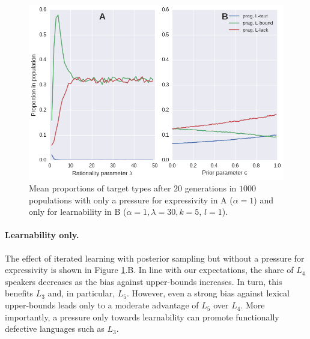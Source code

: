 \documentclass[a4paper]{article}
\begin{document}


\begin{figure}
\centering
\includegraphics[scale=.5]{./fig1-only-R-or-M}
\caption{Mean proportions of target types after $20$ generations in $1000$ populations with only a pressure for expressivity in A ($\alpha = 1$) and only for learnability in B ($\alpha =1, \lambda = 30, k = 5$, $l=1$).}
\label{fig:either-R-or-M}
\end{figure}

\paragraph{Learnability only.} The effect of iterated learning with posterior sampling but without a pressure for expressivity is shown in Figure \ref{fig:either-R-or-M}.B. In line with our expectations, the share of $L_4$ speakers decreases as the bias against upper-bounds increases. In turn, this benefits $L_3$ and, in particular, $L_5$. However, even a strong bias against lexical upper-bounds leads only to a moderate advantage of $L_5$ over $L_4$. More importantly, a pressure only towards learnability can promote functionally defective languages such as $L_3$.
\end{document}
